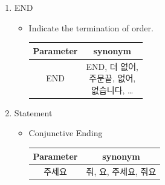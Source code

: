 \documentclass[conference,compsoc]{IEEEtran}
\begin{document}
\begin{enumerate}
\begin{itemize}
  \end{itemize}

  \item END
  \begin{itemize}
    \item Indicate the termination of order.
    \begin{table}[h!] \renewcommand\arraystretch{1.25}
      \centering
        \begin{tabular}{@{}c | c @{}}
        \hline
        Parameter & synonym \\ 
        \hline
        END & \makecell{END, 더 없어, \\ 주문끝, 없어, \\ 없습니다, …}	 \\ 
        \hline
        \end{tabular}
    \end{table} 

  \end{itemize}

  \item Statement
  \begin{itemize}
    \item Conjunctive Ending
    \begin{table}[h!] \renewcommand\arraystretch{1.25}
      \centering
        \begin{tabular}{@{}c | c @{}}
        \hline
        Parameter & synonym \\ 
        \hline
        주세요 & 줘, 요, 주세요, 줘요	 \\ 
        \hline
        \end{tabular}
    \end{table} 

  \end{itemize}
\end{enumerate}
\end{document}
